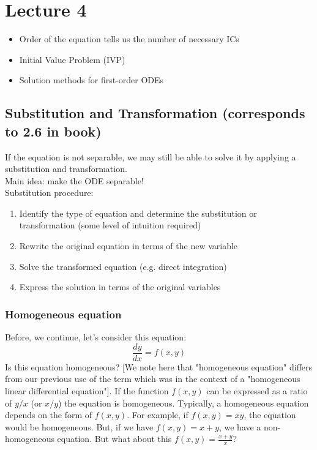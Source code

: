 \chapter*{Lecture 4}
\begin{recall}{}{}
\begin{itemize}
\item Order of the equation tells us the number of necessary ICs
\item Initial Value Problem (IVP)
\item Solution methods for first-order ODEs
\end{itemize}


\end{recall}


\section{Substitution and Transformation (corresponds to 2.6 in book)} 
If the equation is not separable, we may still be able to solve it by applying a substitution and transformation.\\

Main idea: make the ODE separable!\\

Substitution procedure:
\begin{enumerate}
\item Identify the type of equation and determine the substitution or transformation (some level of intuition required)
\item Rewrite the original equation in terms of the new variable
\item Solve the transformed equation (e.g. direct integration)
\item Express the solution in terms of the original variables
\end{enumerate}

\subsection{Homogeneous equation}
Before, we continue, let's consider this equation:
\begin{equation}
\frac{dy}{dx}=f(x,y)
\end{equation}
Is this equation homogeneous? [We note here that "homogeneous equation" differs from our previous use of the term which was in the context of a "homogeneous linear differential equation"]. If the function $f(x,y)$ can be expressed as a ratio of $y/x$ (or $x/y$) the equation is homogeneous.  Typically, a homogeneous equation depends on the form of $f(x,y)$. For example, if $f(x,y)=xy$, the equation would be homogeneous. But, if we have $f(x,y)=x+y$, we have a non-homogeneous equation. But what about this $f(x,y)=\frac{x+y}{x}$?\\

